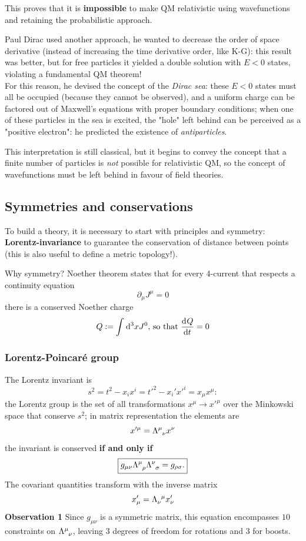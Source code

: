 This proves that it is \textbf{impossible} to make QM relativistic using wavefunctions and retaining
the probabilistic approach.

Paul Dirac used another approach, he wanted to decrease the order of space derivative (instead of
increasing the time derivative order, like K-G): this result was better, but for free particles
it yielded a double solution with $E<0$ states, violating a fundamental QM theorem!\\
For this reason, he devised the concept of the \textit{Dirac sea}:
these $E<0$ states must all be occupied (because they cannot be observed), and a uniform charge
can be factored out of Maxwell's equations with proper boundary conditions; when one of these
particles in the sea is excited, the "hole" left behind can be perceived as a "positive electron":
he predicted the existence of \textit{antiparticles}.

This interpretation is still classical, but it begins to convey the concept that a finite number
of particles is \textit{not} possible for relativistic QM, so the concept of wavefunctions must be
left behind in favour of field theories.
\subsection{Symmetries and conservations}
To build a theory, it is necessary to start with principles and symmetry:
\textbf{Lorentz-invariance} to guarantee the conservation of distance between points (this is also
useful to define a metric topology!).

Why symmetry? Noether theorem states that for every 4-current that respects a continuity equation
$$\partial_\mu J^\mu=0$$
there is a conserved Noether charge
$$Q:=\int_{}^{}\dd^3xJ^0\text{, so that }\dv[]{Q}{t}=0$$
\subsubsection{Lorentz-Poincaré group}
The Lorentz invariant is
$$s^2=t^2-x_ix^i = t'^2-x_i'x'^i = x_\mu x^\mu:$$
the Lorentz group is the set of all transformations $x^\mu\rightarrow x'^\mu$ over the Minkowski
space that conserve $s^2$; in matrix representation the elements are
$$x'^\mu = \Lambda\indices{^\mu_\nu} x^\nu$$
the invariant is conserved \textbf{if and only if}
$$\boxed{g_{\mu\nu}\Lambda\indices{^\mu_\rho}\Lambda\indices{^\nu_\sigma} = g_{\rho\sigma}.}$$
The covariant quantities transform with the inverse matrix
$$x'_\mu = \Lambda\indices{_\nu^\mu} x'_\nu$$
\textbf{Observation 1} Since $g_{\mu\nu}$ is a symmetric matrix, this equation encompasses $10$
constraints on $\Lambda\indices{^\mu_\nu}$, leaving $3$ degrees of freedom for rotations and $3$ for
boosts.

